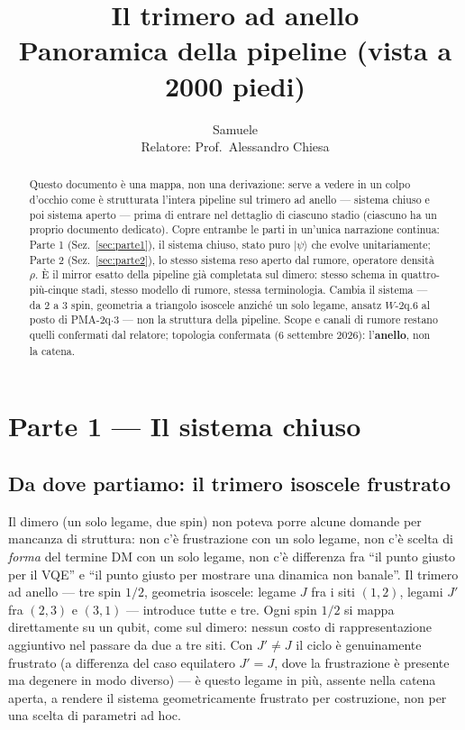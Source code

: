 \documentclass[11pt,a4paper]{article}
\title{Il trimero ad anello\\
\large Panoramica della pipeline (vista a 2000 piedi)}
\author{Samuele \\ Relatore: Prof.\ Alessandro Chiesa}
\date{}
\newcommand{\ket}[1]{\lvert #1 \rangle}
\begin{document}
\maketitle

\begin{abstract}
\noindent Questo documento è una mappa, non una derivazione: serve a
vedere in un colpo d'occhio come è strutturata l'intera pipeline sul
trimero ad anello --- sistema chiuso e poi sistema aperto --- prima di
entrare nel dettaglio di ciascuno stadio (ciascuno ha un proprio
documento dedicato). Copre entrambe le parti in un'unica narrazione
continua: Parte 1 (Sez.~\ref{sec:parte1}), il sistema chiuso, stato puro
$\ket\psi$ che evolve unitariamente; Parte 2 (Sez.~\ref{sec:parte2}), lo
stesso sistema reso aperto dal rumore, operatore densità $\rho$. È il
mirror esatto della pipeline già completata sul dimero: stesso schema in
quattro-più-cinque stadi, stesso modello di rumore, stessa terminologia.
Cambia il sistema --- da 2 a 3 spin, geometria a triangolo isoscele
anziché un solo legame, ansatz $W$-2q.6 al posto di PMA-2q$\cdot$3 ---
non la struttura della pipeline. Scope e canali di rumore restano quelli
confermati dal relatore; topologia confermata (6 settembre 2026):
l'\textbf{anello}, non la catena.
\end{abstract}

\tableofcontents

\section{Parte 1 --- Il sistema chiuso}
\label{sec:parte1}

\subsection{Da dove partiamo: il trimero isoscele frustrato}

Il dimero (un solo legame, due spin) non poteva porre alcune domande per
mancanza di struttura: non c'è frustrazione con un solo legame, non c'è
scelta di \emph{forma} del termine DM con un solo legame, non c'è
differenza fra ``il punto giusto per il VQE'' e ``il punto giusto per
mostrare una dinamica non banale''. Il trimero ad anello --- tre spin
$1/2$, geometria isoscele: legame $J$ fra i siti $(1,2)$, legami $J'$ fra
$(2,3)$ e $(3,1)$ --- introduce tutte e tre. Ogni spin $1/2$ si mappa
direttamente su un qubit, come sul dimero: nessun costo di
rappresentazione aggiuntivo nel passare da due a tre siti. Con
$J'\neq J$ il ciclo è genuinamente frustrato (a differenza del caso
equilatero $J'=J$, dove la frustrazione è presente ma degenere in modo
diverso) --- è questo legame in più, assente nella catena aperta, a
rendere il sistema geometricamente frustrato per costruzione, non per
una scelta di parametri ad hoc.
\end{document}
